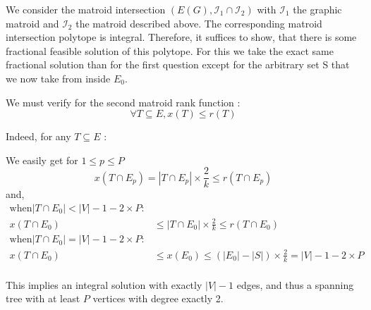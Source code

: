 \documentclass{scrartcl}
\newcommand\1{\mathbf{1}}
\begin{document}
\begin{enumerate}
We consider the matroid intersection $(E(G), \mathcal{I}_1\cap \mathcal{I}_2)$ with $\mathcal{I}_1$ the graphic matroid and $\mathcal{I}_2$ the matroid described above. The corresponding matroid intersection polytope is integral. Therefore, it suffices to show, that there is some fractional feasible solution of this polytope. For this we take the exact same fractional solution than for the first question except for the arbitrary set S that we now take from inside $E_0$.

We must verify for the second matroid rank function :
\[
\forall T \subseteq E, x(T) \leq r(T)
\]

Indeed, for any $T\subseteq E$ : 

We easily get for $1 \leq p \leq P$
\[ 
x(T\cap E_p) = |T\cap E_p| \times \frac{2}{k} \leq r(T\cap E_p)
\]
and,
\begin{align*}
\text{when} |T\cap E_0| < |V| - 1 - 2 \times P :&\\
x(T\cap E_0) & \leq |T\cap E_0| \times \frac{2}{k} \leq r(T\cap E_0)\\
\text{when} |T\cap E_0| = |V| - 1 - 2 \times P :&\\
x(T\cap E_0) & \leq x(E_0) \leq (|E_0| - |S|) \times \frac{2}{k} = |V| - 1 - 2 \times P\\
\end{align*}

This implies an integral solution with exactly $|V| - 1$ edges, and thus a spanning tree with at least $P$ vertices with degree exactly 2.

\end{enumerate}
\end{document}
